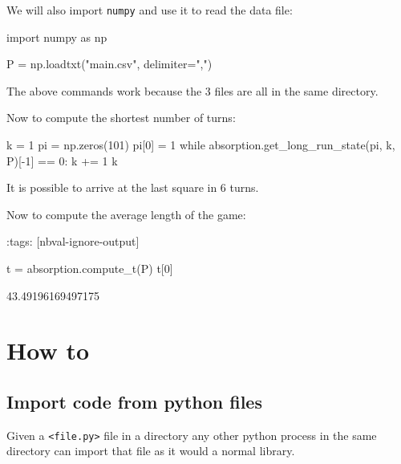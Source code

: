 We will also import \texttt{numpy} and use it to read the data file:




\begin{pyin}
import numpy as np

P = np.loadtxt("main.csv", delimiter=",")
\end{pyin}

\begin{note}
The above commands work because the 3 files are all in the same directory.
\end{note}



Now to compute the shortest number of turns:




\begin{pyin}
k = 1
pi = np.zeros(101)
pi[0] = 1
while absorption.get_long_run_state(pi, k, P)[-1] == 0:
    k += 1
k
\end{pyin}





It is possible to arrive at the last square in 6 turns.


Now to compute the average length of the game:





\begin{pyin}
:tags: [nbval-ignore-output]

t = absorption.compute_t(P)
t[0]
\end{pyin}



\begin{raw}
43.49196169497175
\end{raw}




\section{How to}
\label{\detokenize{building-tools/05-modularisation/how/main:how}}\label{\detokenize{building-tools/05-modularisation/how/main::doc}}

\subsection{Import code from python files}
\label{\detokenize{building-tools/05-modularisation/how/main:how-to-import-code-from-python-files}}

Given a \texttt{<file.py>} file in a directory any other python process in the same
directory can import that file as it would a normal library.


